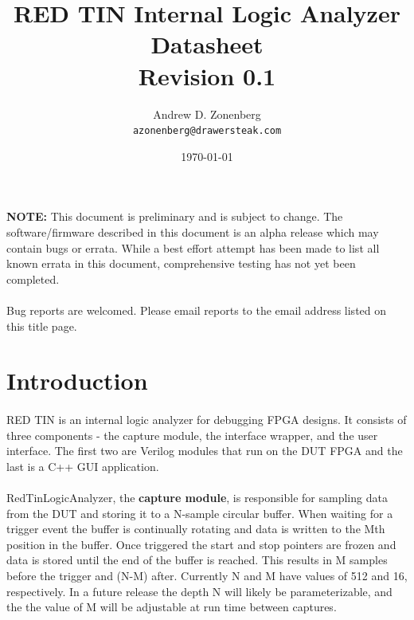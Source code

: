 \documentclass[pdftex]{article}
\begin{document}
\pagestyle{fancy}

\title{RED TIN Internal Logic Analyzer Datasheet\\Revision 0.1}
\author{Andrew D. Zonenberg\\
	\texttt{azonenberg@drawersteak.com}}
\date{\today}
\maketitle

\paragraph*{}
{\bf NOTE: } This document is preliminary and is subject to change. The software/firmware described in this document is
an alpha release which may contain bugs or errata. While a best effort attempt has been made to list all known errata
in this document, comprehensive testing has not yet been completed.

\paragraph*{}
Bug reports are welcomed. Please email reports to the email address listed on this title page.

\pagebreak
\tableofcontents
\pagebreak

\pagebreak
\section{Introduction} 

\paragraph*{}
RED TIN is an internal logic analyzer for debugging FPGA designs. It consists of three components - the capture module,
the interface wrapper, and the user interface. The first two are Verilog modules that run on the DUT FPGA and the last
is a C++ GUI application.

\paragraph*{}
RedTinLogicAnalyzer, the {\bf capture module}, is responsible for sampling data from the DUT and storing it to a
N-sample circular buffer. When waiting for a trigger event the buffer is continually rotating and data is written to the
Mth position in the buffer. Once triggered the start and stop pointers are frozen and data is stored until the end of
the buffer is reached. This results in M samples before the trigger and (N-M) after. Currently N and M have values of
512 and 16, respectively. In a future release the depth N will likely be parameterizable, and the the value of M will be
adjustable at run time between captures.
\end{document}

